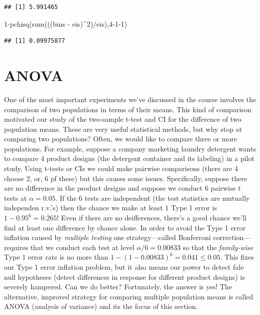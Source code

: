 \documentclass[
]{book}
\newenvironment{Shaded}{\begin{snugshade}}{\end{snugshade}}
\newcommand{\DecValTok}[1]{\textcolor[rgb]{0.00,0.00,0.81}{#1}}
\newcommand{\FunctionTok}[1]{\textcolor[rgb]{0.00,0.00,0.00}{#1}}
\newcommand{\NormalTok}[1]{#1}
\newcommand{\SpecialCharTok}[1]{\textcolor[rgb]{0.00,0.00,0.00}{#1}}
\begin{document}
\begin{verbatim}
## [1] 5.991465
\end{verbatim}

\begin{Shaded}
\begin{Highlighting}[]
\DecValTok{1}\SpecialCharTok{{-}}\FunctionTok{pchisq}\NormalTok{(}\FunctionTok{sum}\NormalTok{(((bins }\SpecialCharTok{{-}}\NormalTok{ eis)}\SpecialCharTok{\^{}}\DecValTok{2}\NormalTok{)}\SpecialCharTok{/}\NormalTok{eis),}\DecValTok{4{-}1{-}1}\NormalTok{)}
\end{Highlighting}
\end{Shaded}

\begin{verbatim}
## [1] 0.09975877
\end{verbatim}

\hypertarget{anova}{%
\chapter{ANOVA}\label{anova}}

One of the most important experiments we've discussed in the course involves the comparison of two populations in terms of their means. This kind of comparison motivated our study of the two-sample t-test and CI for the difference of two population means. These are very useful statistical methods, but why stop at comparing two populations? Often, we would like to compare three or more populations. For example, suppose a company marketing laundry detergent wants to compare 4 product designs (the detergent container and its labeling) in a pilot study. Using t-tests or CIs we could make pairwise comparisons (there are 4 choose 2, or, 6 pf these) but this causes some issues. Specifically, suppose there are no difference in the product designs and suppose we conduct 6 pairwise \(t\) tests at \(\alpha = 0.05\). If the 6 tests are independent (the test statistics are mutually independen r.v.'s) then the chance we make at least 1 Type 1 error is \(1-0.95^6 = 0.265\)! Even if there are no deifferences, there's a good chance we'll find at least one difference by chance alone. In order to avoid the Type 1 error inflation caused by \emph{multiple testing} one strategy---called Bonferroni correction---requires that we conduct each test at level \(\alpha / 6 = 0.00833\) so that the \emph{family-wise} Type 1 error rate is no more than \(1-(1-0.00833)^6 = 0.041 \leq 0.05\). This fixes our Type 1 error inflation problem, but it also means our power to detect fale null hypotheses (detect differences in response for different product designs) is severely hampered. Can we do better? Fortunately, the answer is yes! The alternative, improved strategy for comparing multiple population means is called ANOVA (analysis of variance) and its the focus of this section.
\end{document}
